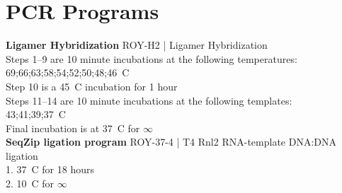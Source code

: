 \section{PCR Programs}\label{apx: PCR Programs}
\textbf{Ligamer Hybridization}
ROY-H2 | Ligamer Hybridization\\
  Steps 1–9 are 10 minute incubations at the following temperatures:\\
  69;66;63;58;54;52;50;48;46\degree~C\\
  Step 10 is a 45\degree~C incubation for 1 hour\\
  Steps 11–14 are 10 minute incubations at the following templates:\\
  43;41;39;37\degree~C\\
  Final incubation is at 37\degree~C for $\infty$\\

\textbf{SeqZip ligation program}
ROY-37-4 | T4 Rnl2 RNA-template DNA:DNA ligation\\
  1. 37\degree~C for 18 hours\\
  2. 10\degree~C for $\infty$ \\

